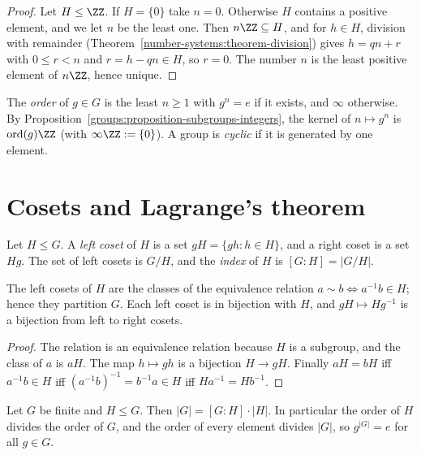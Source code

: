 \begin{proof}
Let $H \leq \ZZ$. If $H = \{0\}$ take $n = 0$. Otherwise $H$ contains a positive
element, and we let $n$ be the least one. Then $n\ZZ \subseteq H$, and for
$h \in H$, division with remainder (Theorem~\ref{number-systems:theorem-division})
gives $h = qn + r$ with $0 \leq r < n$ and $r = h - qn \in H$, so $r = 0$. The number
$n$ is the least positive element of $n\ZZ$, hence unique.
\end{proof}

\begin{definition}\label{groups:definition-order-element}
The \emph{order} of $g \in G$ is the least $n \geq 1$ with $g^n = e$ if it exists, and
$\infty$ otherwise. By Proposition~\ref{groups:proposition-subgroups-integers},
the kernel of $n \mapsto g^n$ is $\operatorname{ord}(g)\ZZ$ (with $\infty \ZZ := \{0\}$).
A group is \emph{cyclic} if it is generated by one element.
\end{definition}

\section{Cosets and Lagrange's theorem}\label{groups:section-cosets}

\begin{definition}\label{groups:definition-cosets}
Let $H \leq G$. A \emph{left coset} of $H$ is a set $gH = \{gh : h \in H\}$, and a
right coset is a set $Hg$. The set of left cosets is $G/H$, and the \emph{index}
of $H$ is $[G : H] = |G/H|$.
\end{definition}

\begin{lemma}\label{groups:lemma-cosets-partition}
The left cosets of $H$ are the classes of the equivalence relation
$a \sim b \iff a^{-1}b \in H$; hence they partition $G$. Each left coset is in
bijection with $H$, and $gH \mapsto Hg^{-1}$ is a bijection from left to right
cosets.
\end{lemma}

\begin{proof}
The relation is an equivalence relation because $H$ is a subgroup, and the class
of $a$ is $aH$. The map $h \mapsto gh$ is a bijection $H \to gH$. Finally $aH = bH$
iff $a^{-1}b \in H$ iff $(a^{-1}b)^{-1} = b^{-1}a \in H$ iff $Ha^{-1} = Hb^{-1}$.
\end{proof}

\begin{theorem}[Lagrange]\label{groups:theorem-lagrange}
Let $G$ be finite and $H \leq G$. Then $|G| = [G : H] \cdot |H|$. In particular the
order of $H$ divides the order of $G$, and the order of every element divides
$|G|$, so $g^{|G|} = e$ for all $g \in G$.
\end{theorem}

